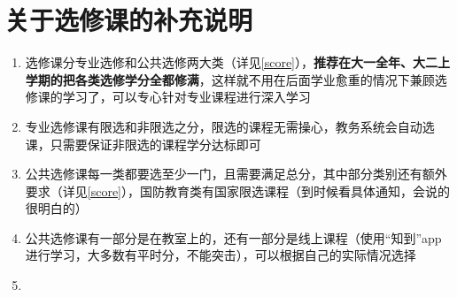\section[关于选修课的补充说明]{关于选修课的补充说明}
\begin{enumerate}
    \item 选修课分专业选修和公共选修两大类（详见\uline{\ref{score}}），\textbf{推荐在大一全年、大二上学期的把各类选修学分全都修满}，这样就不用在后面学业愈重的情况下兼顾选修课的学习了，可以专心针对专业课程进行深入学习
    \item 专业选修课有限选和非限选之分，限选的课程无需操心，教务系统会自动选课，只需要保证非限选的课程学分达标即可
    \item 公共选修课每一类都要选至少一门，且需要满足总分，其中部分类别还有额外要求（详见\uline{\ref{score}}），国防教育类有国家限选课程（到时候看具体通知，会说的很明白的）
    \item 公共选修课有一部分是在教室上的，还有一部分是线上课程（使用“知到”app进行学习，大多数有平时分，不能突击），可以根据自己的实际情况选择\footnotemark
    \item \textbf{}
\end{enumerate}

